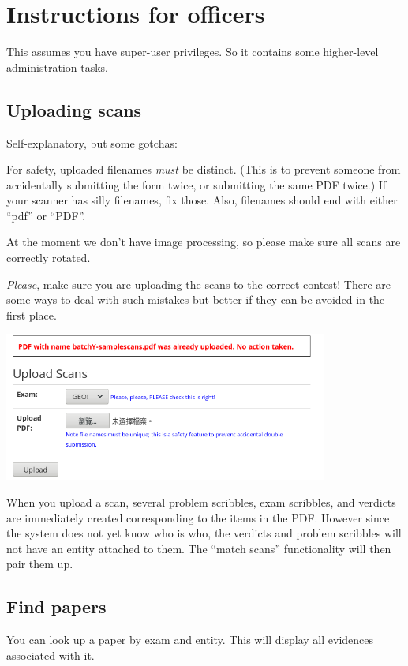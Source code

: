 \chapter{Instructions for officers}
This assumes you have super-user privileges.
So it contains some higher-level administration tasks.

\section{Uploading scans}
Self-explanatory, but some gotchas:
\begin{itemize}
	\ii For safety, uploaded filenames \emph{must} be distinct.
	(This is to prevent someone from accidentally submitting the form twice,
	or submitting the same PDF twice.)
	If your scanner has silly filenames, fix those.
	Also, filenames should end with either ``pdf'' or ``PDF''.

	\ii At the moment we don't have image processing,
	so please make sure all scans are correctly rotated.

	\ii \emph{Please}, make sure you are uploading the scans
	to the correct contest!
	There are some ways to deal with such mistakes but better
	if they can be avoided in the first place.
\end{itemize}

\begin{center}
	\includegraphics[width=0.8\textwidth]{images/batchscan.png}
\end{center}

When you upload a scan,
several problem scribbles, exam scribbles, and verdicts
are immediately created corresponding to the items in the PDF.
However since the system does not yet know who is who,
the verdicts and problem scribbles will not have an entity attached to them.
The ``match scans'' functionality will then pair them up.

\section{Find papers}
You can look up a paper by exam and entity.
This will display all evidences associated with it.

